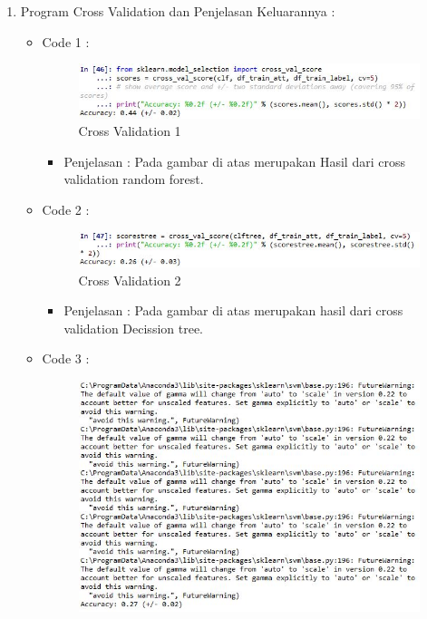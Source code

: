 \begin{enumerate}
\par
\par
\item Program Cross Validation dan Penjelasan Keluarannya :
\begin{itemize}
\item Code 1 :
\par
\begin{figure}[ht]
\centering
\includegraphics[scale=0.7]{figures/pd26.jpg}
\caption{Cross Validation 1}
\label{contoh}
\end{figure}
\par
\begin{itemize}
\item Penjelasan : Pada gambar di atas merupakan Hasil dari cross validation random forest.
\par 
\par
\end{itemize}
\item Code  2  :
\par
\begin{figure}[ht]
\centering
\includegraphics[scale=0.7]{figures/pd27.jpg}
\caption{Cross Validation 2}
\label{contoh}
\end{figure}
\par
\begin{itemize}
\item Penjelasan : Pada gambar di atas merupakan hasil dari cross validation Decission tree.
\par
\par
\end{itemize}
\item Code  3 :
\par
\begin{figure}[ht]
\centering
\includegraphics[scale=0.7]{figures/pd28.jpg}

\end{figure}
\end{itemize}
\end{enumerate}
